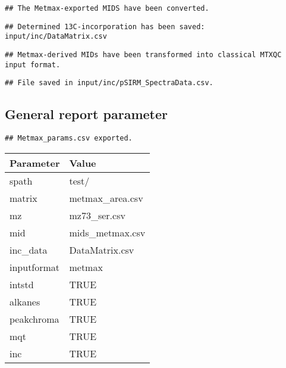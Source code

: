 \documentclass[9pt,]{article}
\begin{document}
\begin{verbatim}
## The Metmax-exported MIDS have been converted.
\end{verbatim}

\begin{verbatim}
## Determined 13C-incorporation has been saved: input/inc/DataMatrix.csv
\end{verbatim}

\begin{verbatim}
## Metmax-derived MIDs have been transformed into classical MTXQC input format.
\end{verbatim}

\begin{verbatim}
## File saved in input/inc/pSIRM_SpectraData.csv.
\end{verbatim}

\pagebreak

\subsection{General report parameter}\label{general-report-parameter}

\begin{verbatim}
## Metmax_params.csv exported.
\end{verbatim}

\begin{longtable}[]{@{}ll@{}}
\toprule
Parameter & Value\tabularnewline
\midrule
\endhead
spath & test/\tabularnewline
matrix & metmax\_area.csv\tabularnewline
mz & mz73\_ser.csv\tabularnewline
mid & mids\_metmax.csv\tabularnewline
inc\_data & DataMatrix.csv\tabularnewline
inputformat & metmax\tabularnewline
intstd & TRUE\tabularnewline
alkanes & TRUE\tabularnewline
peakchroma & TRUE\tabularnewline
mqt & TRUE\tabularnewline
inc & TRUE\tabularnewline
\bottomrule
\end{longtable}
\newpage
\singlespacing 
\end{document}
